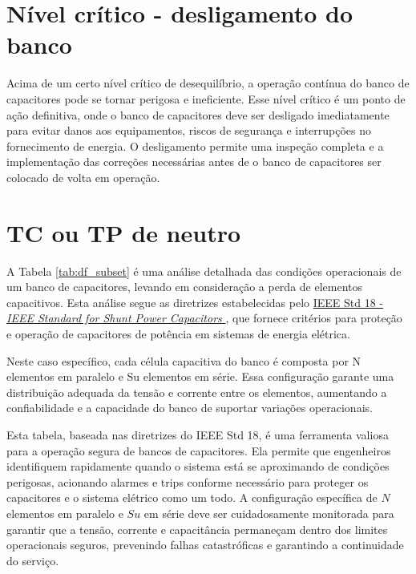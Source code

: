 \documentclass[a4paper]{article}
\begin{document}
\section{Nível crítico - desligamento do banco}
Acima de um certo nível crítico de desequilíbrio, a operação contínua do banco de capacitores pode se tornar perigosa e ineficiente. Esse nível crítico é um ponto de ação definitiva, onde o banco de capacitores deve ser desligado imediatamente para evitar danos aos equipamentos, riscos de segurança e interrupções no fornecimento de energia. O desligamento permite uma inspeção completa e a implementação das correções necessárias antes de o banco de capacitores ser colocado de volta em operação.

\section{TC ou TP de neutro}
A Tabela \ref{tab:df_subset} é uma análise detalhada das condições operacionais de um banco de capacitores, levando em consideração a perda de elementos capacitivos. Esta análise segue as diretrizes estabelecidas pelo \href{https://ieeexplore.ieee.org/document/6466331}{IEEE Std 18 - \textit{IEEE Standard for Shunt Power Capacitors} \cite{ieee18}}, que fornece critérios para proteção e operação de capacitores de potência em sistemas de energia elétrica.

\begin{table}[htbp]
	\setlength{\tabcolsep}{5pt}
	\scriptsize
	\centering
	\caption[]{Tabela de desbalanço (Tensões de alarme e desligamento automático do banco de capacitores)}
	
	\label{tab:df_subset}
\end{table}




Neste caso específico, cada célula capacitiva do banco é composta por {{N}} elementos em paralelo e {{Su}} elementos em série. Essa configuração garante uma distribuição adequada da tensão e corrente entre os elementos, aumentando a confiabilidade e a capacidade do banco de suportar variações operacionais.

Esta tabela, baseada nas diretrizes do IEEE Std 18, é uma ferramenta valiosa para a operação segura de bancos de capacitores. Ela permite que engenheiros identifiquem rapidamente quando o sistema está se aproximando de condições perigosas, acionando alarmes e trips conforme necessário para proteger os capacitores e o sistema elétrico como um todo. A configuração específica de $N$ elementos em paralelo e $Su$ em série deve ser cuidadosamente monitorada para garantir que a tensão, corrente e capacitância permaneçam dentro dos limites operacionais seguros, prevenindo falhas catastróficas e garantindo a continuidade do serviço.
\end{document}
